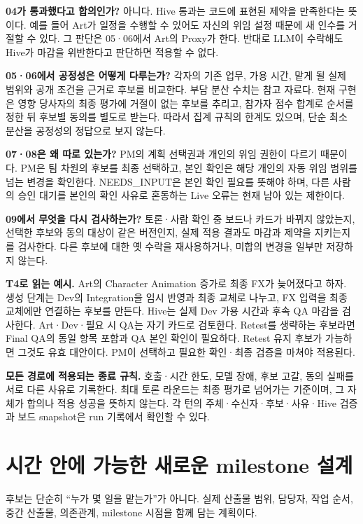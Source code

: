 \documentclass[11pt,a4paper]{article}
\begin{document}
\textbf{04가 통과했다고 합의인가?} 아니다. Hive 통과는 코드에 표현된 제약을 만족한다는 뜻이다. 예를 들어 Art가 일정을 수행할 수 있어도 자신의 위임 설정 때문에 새 인수를 거절할 수 있다. 그 판단은 05·06에서 Art의 Proxy가 한다. 반대로 LLM이 수락해도 Hive가 마감을 위반한다고 판단하면 적용할 수 없다.

\textbf{05·06에서 공정성은 어떻게 다루는가?} 각자의 기존 업무, 가용 시간, 맡게 될 실제 범위와 공개 조건을 근거로 후보를 비교한다. 부담 분산 수치는 참고 자료다. 현재 구현은 영향 당사자의 최종 평가에 거절이 없는 후보를 추리고, 참가자 점수 합계로 순서를 정한 뒤 후보별 동의를 별도로 받는다. 따라서 집계 규칙의 한계도 있으며, 단순 최소 분산을 공정성의 정답으로 보지 않는다.

\textbf{07·08은 왜 따로 있는가?} PM의 계획 선택권과 개인의 위임 권한이 다르기 때문이다. PM은 팀 차원의 후보를 최종 선택하고, 본인 확인은 해당 개인의 자동 위임 범위를 넘는 변경을 확인한다. NEEDS\_INPUT은 본인 확인 필요를 뜻해야 하며, 다른 사람의 승인 대기를 본인의 확인 사유로 혼동하는 Live 오류는 현재 남아 있는 제한이다.

\textbf{09에서 무엇을 다시 검사하는가?} 토론·사람 확인 중 보드나 카드가 바뀌지 않았는지, 선택한 후보와 동의 대상이 같은 버전인지, 실제 적용 결과도 마감과 제약을 지키는지를 검사한다. 다른 후보에 대한 옛 수락을 재사용하거나, 미합의 변경을 일부만 저장하지 않는다.

\textbf{T4로 읽는 예시.} Art의 Character Animation 증가로 최종 FX가 늦어졌다고 하자. 생성 단계는 Dev의 Integration을 임시 반영과 최종 교체로 나누고, FX 입력을 최종 교체에만 연결하는 후보를 만든다. Hive는 실제 Dev 가용 시간과 후속 QA 마감을 검사한다. Art·Dev·필요 시 QA는 자기 카드로 검토한다. Retest를 생략하는 후보라면 Final QA의 동일 항목 포함과 QA 본인 확인이 필요하다. Retest 유지 후보가 가능하면 그것도 유효 대안이다. PM이 선택하고 필요한 확인·최종 검증을 마쳐야 적용된다.

\textbf{모든 경로에 적용되는 종료 규칙.} 호출·시간 한도, 모델 장애, 후보 고갈, 동의 실패를 서로 다른 사유로 기록한다. 최대 토론 라운드는 최종 평가로 넘어가는 기준이며, 그 자체가 합의나 적용 성공을 뜻하지 않는다. 각 턴의 주체·수신자·후보·사유·Hive 검증과 보드 snapshot은 run 기록에서 확인할 수 있다.

\newpage
\section{시간 안에 가능한 새로운 milestone 설계}
후보는 단순히 ``누가 몇 일을 맡는가''가 아니다. 실제 산출물 범위, 담당자, 작업 순서, 중간 산출물, 의존관계, milestone 시점을 함께 담는 계획이다.
\end{document}
